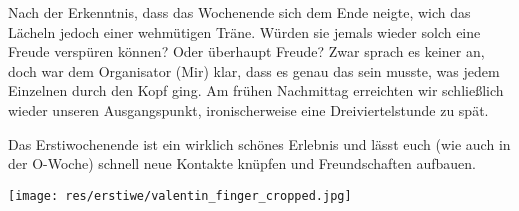 \begin{multicols*}{2}
Nach der Erkenntnis, dass das Wochenende sich dem Ende neigte, wich das Lächeln jedoch einer wehmütigen Träne.
Würden sie jemals wieder solch eine Freude verspüren können?
Oder überhaupt Freude?
Zwar sprach es keiner an, doch war dem Organisator (Mir) klar, dass es genau das sein musste, was jedem Einzelnen durch den Kopf ging.
Am frühen Nachmittag erreichten wir schließlich wieder unseren Ausgangspunkt, ironischerweise eine Dreiviertelstunde zu spät. 

Das Erstiwochenende ist ein wirklich schönes Erlebnis und lässt euch (wie auch in der O-Woche) schnell neue Kontakte knüpfen und Freundschaften aufbauen.

\vspace{8ex}
\begin{center}
	\texttt{[image: res/erstiwe/valentin\_finger\_cropped.jpg]}
\end{center}
\end{multicols*}
